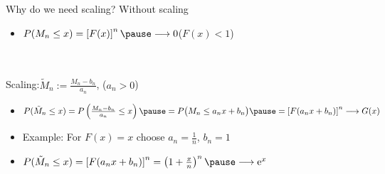\begin{frame}{Why do we need scaling?}
    Without scaling
    \begin{itemize}
        \item[\bpt] $P(M_n \le x) = \left[ F(x) \right]^n \pause \longrightarrow 0$\quad ($F(x) < 1$)
    \end{itemize}
    \,\\ \,\\
    {\pause}Scaling:\quad $\tilde{M}_n := \frac{M_n - b_n}{a_n}$, ($a_n>0$)
    \begin{itemize}
        \pause\item[\bpt] $P(\tilde{M}_n \le x) = P\left( \frac{M_n - b_n}{a_n} \le x \right) \pause = P\big( M_n \le a_n x + b_n \big) \pause = \left[ F(a_nx + b_n) \right]^n \longrightarrow G(x)$
        \pause\item[\bpt] Example: For $F(x) = x$ choose $a_n = \frac{1}{n}$, $b_n = 1$
        \pause\item[\bpt] $P(\tilde{M}_n \le x) = \left[ F(a_nx + b_n) \right]^n = \left( 1 + \frac{x}{n} \right)^n \pause \longrightarrow \e^{x}$
    \end{itemize}
\end{frame}


